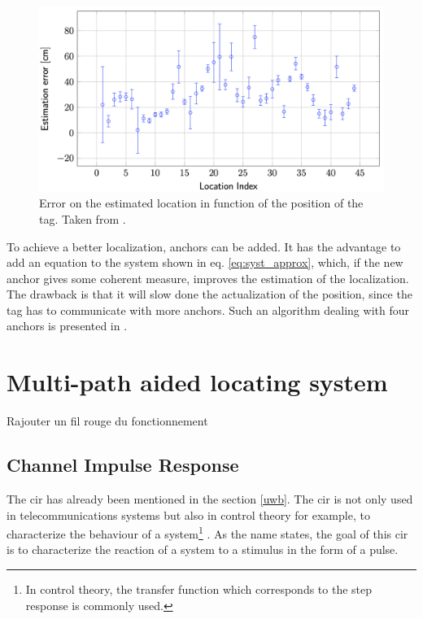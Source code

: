 \begin{figure}[H]
	\centering
	\includegraphics[width=.8\linewidth]{Images/test_fig.png}
	\caption{Error on the estimated location in function of the position of the tag. Taken from \cite{hannotier2019indoor}.}
	\label{fig:test_result}
\end{figure}

To achieve a better localization, anchors can be added. It has the advantage to add an equation to the system shown in eq. \ref{eq:syst_approx}, which, if the new anchor gives some coherent measure, improves the estimation of the localization. The drawback is that it will slow done the actualization of the position, since the tag has to communicate with more anchors. Such an algorithm dealing with four anchors is presented in \cite{guyard2019navigation}.

\section{Multi-path aided locating system}
\label{mpls}

\color{red} Rajouter un fil rouge du fonctionnement \color{black}

\subsection{Channel Impulse Response}
\label{mp_cir}

The \gls{cir} has already been mentioned in the section \ref{uwb}. The \gls{cir} is not only used in telecommunications systems but also in control theory for example, to characterize the behaviour of a system\footnote{In control theory, the transfer function which corresponds to the step response is commonly used.} \cite{garonne2019course}. As the name states, the goal of this \gls{cir} is to characterize the reaction of a system to a stimulus in the form of a pulse.
\vspace{2mm}

